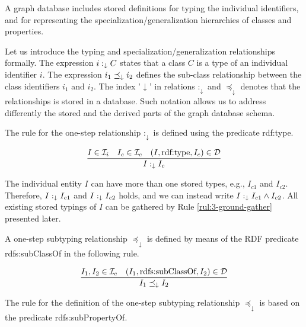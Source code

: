 \documentclass[runningheads]{llncs}
\newcommand{\darr}{\downarrow}
\newcommand{\D}{{\cal D}}
\newcommand{\Ii}{{\cal I}_i}
\newcommand{\Ic}{{\cal I}_c}
\newcommand{\memo}[1]{}
\newcommand{\notes}[1]{\noindent\begin{small}-- \emph{#1}\\\end{small}}
\begin{document}
A graph database includes stored definitions for typing the individual
identifiers, and for representing the specialization/generalization
hierarchies of classes and properties.

Let us introduce the typing and specialization/generalization
relationships formally. The expression $i:_\darr\/C$ states that a
class $C$ is a type of an individual identifier $i$. The expression
$i_1\preceq_\darr\/i_2$ defines the sub-class relationship between the
class identifiers $i_1$ and $i_2$. The index '$\darr$' in relations
$:_\darr$ and $\preceq_\darr$ denotes that the relationships is stored
in a database. Such notation allows us to address differently the
stored and the derived parts of the graph database schema.


\memo{Oportunity to introduce ``mixed'' objects including ground and schema components.}

The rule for the one-step relationship $:_\darr$ is defined using the
predicate rdf:type.

\begin{equation}
\dfrac{I\in\Ii\quad I_c\in\Ic\quad (I,\text{rdf:type},I_c)\in \D}
      {I :_\darr I_c}
\end{equation}

The individual entity $I$ can have more than one stored types, e.g.,
$I_{c1}$ and $I_{c2}$. Therefore, $I:_\darr\/I_{c1}$ and
$I:_\darr\/I_{c2}$ holds, and we can instead write
$I:_\darr\/I_{c1}\land\/I_{c2}$. All existing stored typings of $I$
can be gathered by Rule \ref{rul:3-ground-gather} presented later.

A one-step subtyping relationship $\preceq_\darr$ is defined by means
of the RDF predicate rdfs:sub\-ClassOf in the following rule.

\begin{equation}
\dfrac{I_1,I_2\in\Ic \quad (I_1,\text{rdfs:subClassOf},I_2)\in \D}
{I_1 \preceq_\darr\/I_2}
\end{equation}

The rule for the definition of the one-step subtyping relationship
$\preceq_\darr$ is based on the predicate rdfs:subPropertyOf.
\end{document}

